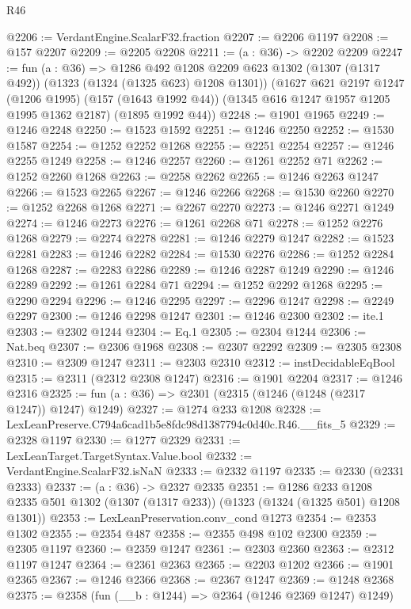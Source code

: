 \begin{lexlean}{R46}
\begin{coremodule}
@2206 := VerdantEngine.ScalarF32.fraction
@2207 := @2206 @1197
@2208 := @157 @2207
@2209 := @2205 @2208
@2211 := (a : @36) -> @2202 @2209
@2247 := fun (a : @36) =>
  @1286
    @492
    @1208
    @2209
    @623
    @1302
    (@1307 (@1317 @492))
    (@1323 (@1324 (@1325 @623) @1208 @1301))
    (@1627
      @621
      @2197
      @1247
      (@1206 @1995)
      (@157 (@1643 @1992 @44))
      (@1345 @616 @1247 @1957 @1205 @1995 @1362 @2187)
      (@1895 @1992 @44))
@2248 := @1901 @1965
@2249 := @1246 @2248
@2250 := @1523 @1592
@2251 := @1246 @2250
@2252 := @1530 @1587
@2254 := @1252 @2252 @1268
@2255 := @2251 @2254
@2257 := @1246 @2255 @1249
@2258 := @1246 @2257
@2260 := @1261 @2252 @71
@2262 := @1252 @2260 @1268
@2263 := @2258 @2262
@2265 := @1246 @2263 @1247
@2266 := @1523 @2265
@2267 := @1246 @2266
@2268 := @1530 @2260
@2270 := @1252 @2268 @1268
@2271 := @2267 @2270
@2273 := @1246 @2271 @1249
@2274 := @1246 @2273
@2276 := @1261 @2268 @71
@2278 := @1252 @2276 @1268
@2279 := @2274 @2278
@2281 := @1246 @2279 @1247
@2282 := @1523 @2281
@2283 := @1246 @2282
@2284 := @1530 @2276
@2286 := @1252 @2284 @1268
@2287 := @2283 @2286
@2289 := @1246 @2287 @1249
@2290 := @1246 @2289
@2292 := @1261 @2284 @71
@2294 := @1252 @2292 @1268
@2295 := @2290 @2294
@2296 := @1246 @2295
@2297 := @2296 @1247
@2298 := @2249 @2297
@2300 := @1246 @2298 @1247
@2301 := @1246 @2300
@2302 := ite.{1}
@2303 := @2302 @1244
@2304 := Eq.{1}
@2305 := @2304 @1244
@2306 := Nat.beq
@2307 := @2306 @1968
@2308 := @2307 @2292
@2309 := @2305 @2308
@2310 := @2309 @1247
@2311 := @2303 @2310
@2312 := instDecidableEqBool
@2315 := @2311 (@2312 @2308 @1247)
@2316 := @1901 @2204
@2317 := @1246 @2316
@2325 := fun (a : @36) => @2301 (@2315 (@1246 (@1248 (@2317 @1247)) @1247) @1249)
@2327 := @1274 @233 @1208
@2328 := LexLeanPreserve.C794a6cad1b5e8fdc98d1387794c0d40c.R46.__fits_5
@2329 := @2328 @1197
@2330 := @1277 @2329
@2331 := LexLeanTarget.TargetSyntax.Value.bool
@2332 := VerdantEngine.ScalarF32.isNaN
@2333 := @2332 @1197
@2335 := @2330 (@2331 @2333)
@2337 := (a : @36) -> @2327 @2335
@2351 := @1286
    @233
    @1208
    @2335
    @501
    @1302
    (@1307 (@1317 @233))
    (@1323 (@1324 (@1325 @501) @1208 @1301))
@2353 := LexLeanPreservation.conv_cond @1273
@2354 := @2353 @1302
@2355 := @2354 @487
@2358 := @2355 @498 @102 @2300
@2359 := @2305 @1197
@2360 := @2359 @1247
@2361 := @2303 @2360
@2363 := @2312 @1197 @1247
@2364 := @2361 @2363
@2365 := @2203 @1202
@2366 := @1901 @2365
@2367 := @1246 @2366
@2368 := @2367 @1247
@2369 := @1248 @2368
@2375 := @2358 (fun (__b : @1244) => @2364 (@1246 @2369 @1247) @1249)

\end{coremodule}
\end{lexlean}
